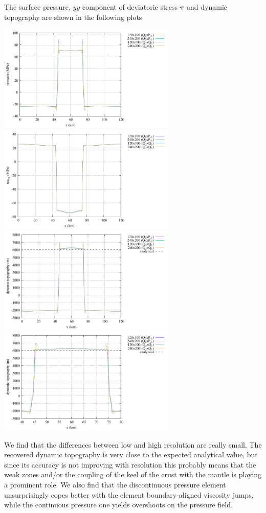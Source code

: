 The surface pressure, $yy$ component of deviatoric stress ${\bm \tau}$ 
and dynamic topography are shown in the following plots
\begin{center}
\includegraphics[width=8.5cm]{python_codes/fieldstone_160/results/pressure.pdf}
\includegraphics[width=8.5cm]{python_codes/fieldstone_160/results/tau_yy.pdf}\\
\includegraphics[width=8.5cm]{python_codes/fieldstone_160/results/dyn_topo.pdf}
\includegraphics[width=8.5cm]{python_codes/fieldstone_160/results/dyn_topo2.pdf}
\end{center}
We find that the differences between low and high resolution are really small. 
The recovered dynamic topography is very close to the expected analytical value,
but since its accuracy is not improving with resolution this probably means that the 
weak zones and/or the coupling of the keel of the crust with the mantle is 
playing a prominent role.
We also find that the discontinuous pressure element unsurprisingly copes better 
with the element boundary-aligned viscosity jumps, while the continuous pressure 
one yields overshoots on the pressure field.

